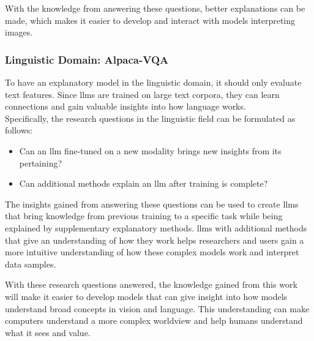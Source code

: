 With the knowledge from answering these questions, better explanations can be made, which makes it easier to develop and interact with models interpreting images. 


\subsubsection{Linguistic Domain: Alpaca-VQA}
To have an explanatory model in the linguistic domain, it should only evaluate text features. Since \glspl{llm} are trained on large text corpora, they can learn connections and gain valuable insights into how language works. \\
Specifically, the research questions in the linguistic field can be formulated as follows:

\begin{itemize}
    \item Can an \gls{llm} fine-tuned on a new modality brings new insights from its pertaining?

    \item Can additional methods explain an \gls{llm} after training is complete?
\end{itemize}

The insights gained from answering these questions can be used to create \glspl{llm} that bring knowledge from previous training to a specific task while being explained by supplementary explanatory methods. \glspl{llm} with additional methods that give an understanding of how they work helps researchers and users gain a more intuitive understanding of how these complex models work and interpret data samples. 





With these research questions answered, the knowledge gained from this work
will make it easier to develop models that can give insight into how models understand broad concepts in vision and language. 
This understanding can make computers understand a more complex worldview and help humans understand what it sees and value.



